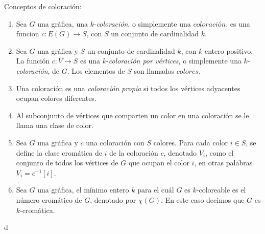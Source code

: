 \begin{definicion} Conceptos de coloraci\'on:
    \label{def:coloracion}
    \begin{enumerate}
        \item Sea $G$ una gr\'afica, una $k$-\textit{coloraci\'on}, o
        simplemente una $\textit{coloraci\'on}$, es una funcion $c \colon
        E(G)\to S$, con $S$ un conjunto de cardinalidad $k$.
        \item Sea $G$ una gr\'afica y $S$ un conjunto de cardinalidad $k$, con
        $k$ entero positivo. La funci\'on $c: V \to S$ es una
        $k$-\textit{coloraci\'on por v\'ertices}, o simplemente una
        $k$-\textit{coloraci\'on}, de $G$. Los elementos de $S$ son llamados
        $\textit{colores}$.
        \item Una coloraci\'on es una \textit{coloraci\'on propia} si todos los
        v\'ertices adyacentes ocupan colores diferentes.
        \item Al subconjunto de v\'ertices que comparten un color en una
        coloraci\'on se le llama una clase de color.
        \item Sea $G$ una gr\'afica y $c$ una coloraci\'on con $S$ colores. Para
        cada color $i \in S$, se define la clase crom\'atica de $i$ de la
        coloraci\'on $c$, denotado $V_i$, como el conjunto de todos los
        v\'ertices de $G$ que ocupan el color $i$, en otras palabras $V_i =
        c^{-1}[i]$.
        \item  Sea $G$ una gr\'afica, el m\'inimo entero $k$ para el cu\'al $G$
        es $k$-coloreable es el n\'umero crom\'atico de $G$, denotado por
        $\chi(G)$. En este caso decimos que $G$ es $k$-crom\'atica.
    \end{enumerate}
\end{definicion}d

